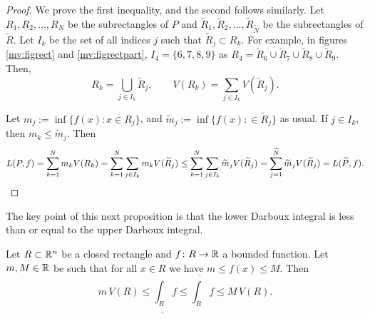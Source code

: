 \begin{proof}
We prove the first inequality, and the second follows similarly.
Let $R_1,R_2,\ldots,R_N$ be the subrectangles of $P$
and
$\widetilde{R}_1,\widetilde{R}_2,\ldots,\widetilde{R}_{\widetilde{N}}$ be the
subrectangles of
$\widetilde{R}$.
Let $I_k$ be the set of all indices $j$ such that $\widetilde{R}_j \subset R_k$.
For example, in figures \ref{mv:figrect} and
\ref{mv:figrectpart}, $I_4 = \{ 6, 7, 8, 9 \}$ as
$R_4 =
\widetilde{R}_6 \cup \widetilde{R}_7 \cup
\widetilde{R}_8 \cup \widetilde{R}_9$.
Then,
\begin{equation*}
R_k = \bigcup_{j \in I_k} \widetilde{R}_j,
\qquad
V(R_k) = \sum_{j \in I_k} V(\widetilde{R}_j).
\end{equation*}

Let $m_j := \inf \{ f(x) : x \in R_j \}$, and
$\widetilde{m}_j := \inf \{ f(x) : \in \widetilde{R}_j \}$ as usual.
If $j \in I_k$, then $m_k \leq \widetilde{m}_j$.  Then
\begin{equation*}
L(P,f) =
\sum_{k=1}^N m_k V(R_k)
=
\sum_{k=1}^N \sum_{j\in I_k} m_k V(\widetilde{R}_j)
\leq
\sum_{k=1}^N \sum_{j\in I_k} \widetilde{m}_j V(\widetilde{R}_j)
=
\sum_{j=1}^{\widetilde{N}} \widetilde{m}_j V(\widetilde{R}_j) = L(\widetilde{P},f) . \qedhere
\end{equation*}
\end{proof}

The key point of this next proposition is that
the lower Darboux integral is less than or equal to the upper Darboux
integral.

\begin{prop} \label{mv:intulbound:prop}
Let $R \subset {\mathbb{R}}^n$ be a closed rectangle and
$f \colon R \to {\mathbb{R}}$ a bounded function.  Let $m, M \in {\mathbb{R}}$ be 
such that for all $x \in R$ we have $m \leq f(x) \leq M$.  Then
\begin{equation}
\label{mv:intulbound:eq}
m \, V(R) \leq
\underline{\int_R} f \leq \overline{\int_R} f
\leq M \, V(R).
\end{equation}
\end{prop}

